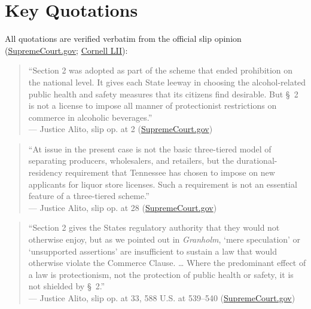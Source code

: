 \documentclass[12pt]{article}
\begin{document}
\section{Key Quotations}

All quotations are verified verbatim from the official slip opinion (\href{https://www.supremecourt.gov/opinions/18pdf/18-96_5i36.pdf}{SupremeCourt.gov}; \href{https://www.law.cornell.edu/supremecourt/text/18-96}{Cornell LII}):

\begin{quote}
``Section 2 was adopted as part of the scheme that ended prohibition on the national level. It gives each State leeway in choosing the alcohol-related public health and safety measures that its citizens find desirable. But \S~2 is not a license to impose all manner of protectionist restrictions on commerce in alcoholic beverages.'' \\
--- Justice Alito, slip op. at 2 (\href{https://www.supremecourt.gov/opinions/18pdf/18-96_5i36.pdf}{SupremeCourt.gov})
\end{quote}

\begin{quote}
``At issue in the present case is not the basic three-tiered model of separating producers, wholesalers, and retailers, but the durational-residency requirement that Tennessee has chosen to impose on new applicants for liquor store licenses. Such a requirement is not an essential feature of a three-tiered scheme.'' \\
--- Justice Alito, slip op. at 28 (\href{https://www.supremecourt.gov/opinions/18pdf/18-96_5i36.pdf}{SupremeCourt.gov})
\end{quote}

\begin{quote}
``Section 2 gives the States regulatory authority that they would not otherwise enjoy, but as we pointed out in \textit{Granholm}, `mere speculation' or `unsupported assertions' are insufficient to sustain a law that would otherwise violate the Commerce Clause. \ldots{} Where the predominant effect of a law is protectionism, not the protection of public health or safety, it is not shielded by \S~2.'' \\
--- Justice Alito, slip op. at 33, 588 U.S. at 539--540 (\href{https://www.supremecourt.gov/opinions/18pdf/18-96_5i36.pdf}{SupremeCourt.gov})
\end{quote}
\end{document}
